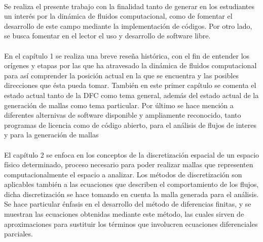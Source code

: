 \documentclass[letterpaper, openright, 12pt]{book}
\begin{document}
    \paragraph*{}
    Se realiza el presente trabajo con la finalidad tanto de generar en los
    estudiantes un interés por la dinámica de fluidos computacional, como
    de fomentar el desarrollo de este campo mediante la implementación de
    códigos. Por otro lado, se busca fomentar en el lector el uso y desarrollo
    de software libre.

    \paragraph*{}
    En el capítulo 1 se realiza una breve reseña histórica, con el fin de
    entender los orígenes y etapas por las que ha atravesado la dinámica de
    fluidos computacional para así comprender la posición actual en la que se
    encuentra y las posibles direcciones que ésta pueda tomar. También en este
    primer capítulo se comenta el estado actual tanto de la DFC como tema
    general, además del estado actual de la generación de mallas como tema
    particular. Por último se hace mención a diferentes alternivas de software
    disponible y ampliamente reconocido, tanto programas de licencia como de
    código abierto, para el análisis de flujos de interes y para la generación
    de mallas

    \paragraph*{}
    El capítulo 2 se enfoca en los conceptos de la discretización espacial de
    un espacio físico determinado, proceso necesario para poder realizar
    mallas que representen computacionalmente el espacio a analizar. Los
    métodos de discretización son aplicables también a las ecuaciones que
    describen el comportamiento de los flujos, dicha discretización se hace
    tomando en cuenta la malla generada para el análisis. Se hace particular
    énfasis en el desarrollo del método de diferencias finitas, y se muestran
    las ecuaciones obtenidas mediante este método, las cuales sirven de
    aproximaciones para sustituir los términos que involucren ecuaciones
    diferenciales parciales.
\end{document}
